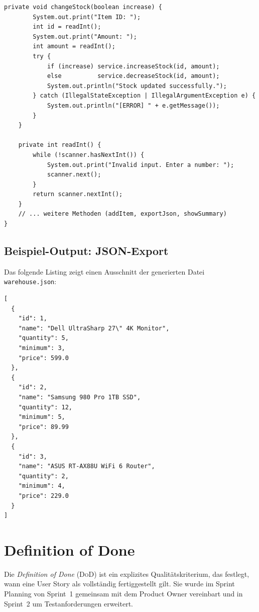 \documentclass[12pt, a4paper, twoside]{report}
\newcommand{\dod}{\textit{Definition of Done}}
\begin{document}
\begin{lstlisting}[caption={ConsoleUI.java -- Präsentationsschicht (Auszug)}, label={lst:ui}]
    private void changeStock(boolean increase) {
        System.out.print("Item ID: ");
        int id = readInt();
        System.out.print("Amount: ");
        int amount = readInt();
        try {
            if (increase) service.increaseStock(id, amount);
            else          service.decreaseStock(id, amount);
            System.out.println("Stock updated successfully.");
        } catch (IllegalStateException | IllegalArgumentException e) {
            System.out.println("[ERROR] " + e.getMessage());
        }
    }

    private int readInt() {
        while (!scanner.hasNextInt()) {
            System.out.print("Invalid input. Enter a number: ");
            scanner.next();
        }
        return scanner.nextInt();
    }
    // ... weitere Methoden (addItem, exportJson, showSummary)
}
\end{lstlisting}

\section{Beispiel-Output: JSON-Export}

Das folgende Listing zeigt einen Ausschnitt der generierten Datei \texttt{warehouse.json}:

\begin{lstlisting}[language={}, caption={warehouse.json -- Beispielausgabe (Auszug)}, label={lst:jsonout}]
[
  {
    "id": 1,
    "name": "Dell UltraSharp 27\" 4K Monitor",
    "quantity": 5,
    "minimum": 3,
    "price": 599.0
  },
  {
    "id": 2,
    "name": "Samsung 980 Pro 1TB SSD",
    "quantity": 12,
    "minimum": 5,
    "price": 89.99
  },
  {
    "id": 3,
    "name": "ASUS RT-AX88U WiFi 6 Router",
    "quantity": 2,
    "minimum": 4,
    "price": 229.0
  }
]
\end{lstlisting}

\chapter{Definition of Done}
\label{chap:dod}

Die \dod{} (\textsc{DoD}) ist ein explizites Qualitätskriterium, das festlegt, wann eine
User Story als vollständig fertiggestellt gilt. Sie wurde im Sprint Planning von Sprint~1
gemeinsam mit dem Product Owner vereinbart und in Sprint~2 um Testanforderungen erweitert.
\end{document}

